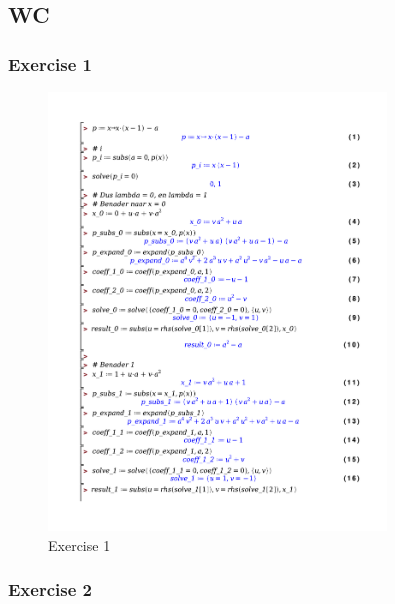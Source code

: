 \documentclass[a4paper]{report}
\begin{document}
\subsection{WC}

\subsubsection{Exercise 1}

\begin{figure}[H]
	\centering
	\includegraphics[width=0.8\textwidth]{./exercises/wc_1_ex_1.pdf}
	\caption{Exercise 1}
\end{figure}

\subsubsection{Exercise 2}
\end{document}
